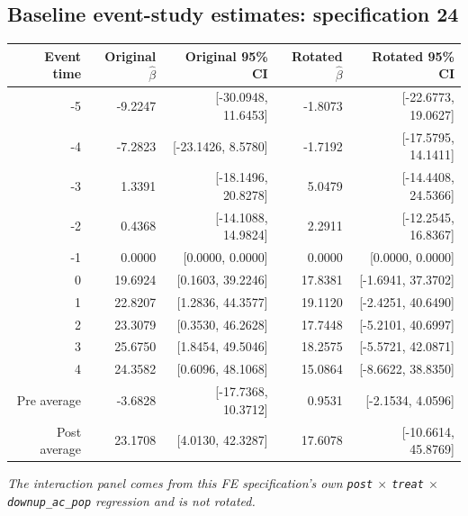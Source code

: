 \documentclass[10pt]{article}
\begin{document}
\subsection*{Baseline event-study estimates: specification 24}
\begin{center}
\scriptsize
\begin{tabular}{r rr rr}
\toprule
Event time & Original $\hat\beta$ & Original 95\% CI & Rotated $\hat\beta$ & Rotated 95\% CI \\
\midrule
-5 & -9.2247 & [-30.0948, 11.6453] & -1.8073 & [-22.6773, 19.0627] \\
-4 & -7.2823 & [-23.1426, 8.5780] & -1.7192 & [-17.5795, 14.1411] \\
-3 & 1.3391 & [-18.1496, 20.8278] & 5.0479 & [-14.4408, 24.5366] \\
-2 & 0.4368 & [-14.1088, 14.9824] & 2.2911 & [-12.2545, 16.8367] \\
-1 & 0.0000 & [0.0000, 0.0000] & 0.0000 & [0.0000, 0.0000] \\
0 & 19.6924 & [0.1603, 39.2246] & 17.8381 & [-1.6941, 37.3702] \\
1 & 22.8207 & [1.2836, 44.3577] & 19.1120 & [-2.4251, 40.6490] \\
2 & 23.3079 & [0.3530, 46.2628] & 17.7448 & [-5.2101, 40.6997] \\
3 & 25.6750 & [1.8454, 49.5046] & 18.2575 & [-5.5721, 42.0871] \\
4 & 24.3582 & [0.6096, 48.1068] & 15.0864 & [-8.6622, 38.8350] \\
\midrule
Pre average & -3.6828 & [-17.7368, 10.3712] & 0.9531 & [-2.1534, 4.0596] \\
Post average & 23.1708 & [4.0130, 42.3287] & 17.6078 & [-10.6614, 45.8769] \\
\bottomrule
\end{tabular}
\end{center}
\medskip
\textit{The interaction panel comes from this FE specification's own \texttt{post} $\times$ \texttt{treat} $\times$ \texttt{downup\_ac\_pop} regression and is not rotated.}
\clearpage
\end{document}
